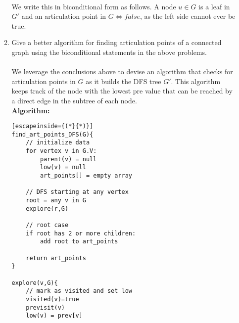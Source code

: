 \documentclass{article}
\begin{document}
\begin{enumerate}
\begin{enumerate}
	\\ We write this in biconditional form as follows. A node $u \in G$ is a leaf in $G'$ and an articulation point in $G \iff false$, as the left side cannot ever be true.
	\item Give a better algorithm for finding articulation points of a connected graph using the biconditional statements in the above problems.
	\\\\ We leverage the conclusions above to devise an algorithm that checks for articulation points in $G$ as it builds the DFS tree $G'$. This algorithm keeps track of the node with the lowest pre value that can be reached by a direct edge in the subtree of each node.
	\\ \textbf{Algorithm:}
	\begin{lstlisting}[escapeinside={(*}{*)}]
find_art_points_DFS(G){
	// initialize data
	for vertex v in G.V:
		parent(v) = null
		low(v) = null
		art_points[] = empty array
		
	// DFS starting at any vertex
	root = any v in G
	explore(r,G)
	
	// root case
	if root has 2 or more children:
		add root to art_points
	
	return art_points
}

explore(v,G){
	// mark as visited and set low
	visited(v)=true
	previsit(v)
	low(v) = prev[v]
	

\end{lstlisting}
\end{enumerate}
\end{enumerate}
\end{document}
